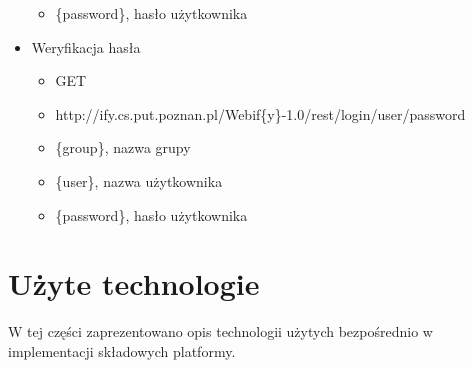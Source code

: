 \documentclass[11pt,a4paper,polish,thesis]{dcsbook}
\begin{document}
\begin{itemize}
\begin{itemize}
		\item \{password\},  hasło użytkownika 
	\end{itemize}
	\item Weryfikacja hasła
	\begin{itemize}
		\item GET
		\item http://ify.cs.put.poznan.pl/Webif\{y\}-1.0/rest/login/{user}/{password}
		\item \{group\}, nazwa grupy
		\item \{user\}, nazwa użytkownika
		\item \{password\},  hasło użytkownika 
	\end{itemize}
\end{itemize}

\section{Użyte technologie}
W tej części zaprezentowano opis technologii użytych bezpośrednio w implementacji składowych platformy.
\end{document}
